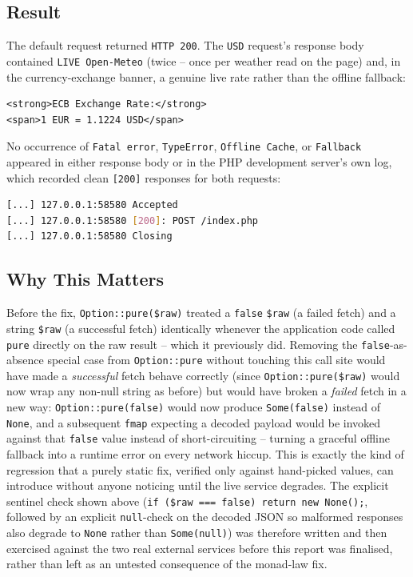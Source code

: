 \subsection{Result}

The default request returned \texttt{HTTP 200}. The \texttt{USD} request's response body contained \texttt{LIVE Open-Meteo} (twice -- once per weather read on the page) and, in the currency-exchange banner, a genuine live rate rather than the offline fallback:
\begin{lstlisting}
<strong>ECB Exchange Rate:</strong>
<span>1 EUR = 1.1224 USD</span>
\end{lstlisting}
No occurrence of \texttt{Fatal error}, \texttt{TypeError}, \texttt{Offline Cache}, or \texttt{Fallback} appeared in either response body or in the PHP development server's own log, which recorded clean \texttt{[200]} responses for both requests:
\begin{lstlisting}[language=bash]
[...] 127.0.0.1:58580 Accepted
[...] 127.0.0.1:58580 [200]: POST /index.php
[...] 127.0.0.1:58580 Closing
\end{lstlisting}

\subsection{Why This Matters}

Before the fix, \texttt{Option::pure(\$raw)} treated a \texttt{false} \texttt{\$raw} (a failed fetch) and a string \texttt{\$raw} (a successful fetch) identically whenever the application code called \texttt{pure} directly on the raw result -- which it previously did. Removing the \texttt{false}-as-absence special case from \texttt{Option::pure} without touching this call site would have made a \emph{successful} fetch behave correctly (since \texttt{Option::pure(\$raw)} would now wrap any non-null string as before) but would have broken a \emph{failed} fetch in a new way: \texttt{Option::pure(false)} would now produce \texttt{Some(false)} instead of \texttt{None}, and a subsequent \texttt{fmap} expecting a decoded payload would be invoked against that \texttt{false} value instead of short-circuiting -- turning a graceful offline fallback into a runtime error on every network hiccup. This is exactly the kind of regression that a purely static fix, verified only against hand-picked values, can introduce without anyone noticing until the live service degrades. The explicit sentinel check shown above (\texttt{if (\$raw === false) return new None();}, followed by an explicit \texttt{null}-check on the decoded JSON so malformed responses also degrade to \texttt{None} rather than \texttt{Some(null)}) was therefore written and then exercised against the two real external services before this report was finalised, rather than left as an untested consequence of the monad-law fix.
